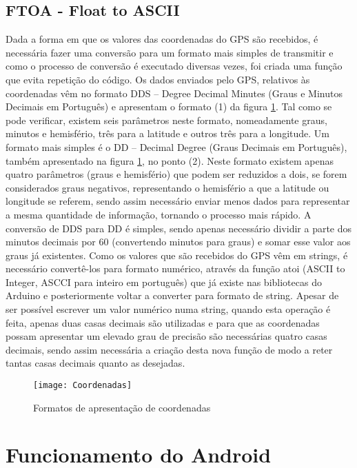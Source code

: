 \subsection{FTOA - Float to ASCII}
\label{sub:FTOA}

Dada a forma em que os valores das coordenadas do GPS são recebidos, é necessária fazer uma conversão para um formato mais simples de transmitir e como o processo de conversão é executado diversas vezes, foi criada uma função que evita repetição do código.
Os dados enviados pelo GPS, relativos às coordenadas vêm no formato DDS – Degree Decimal Minutes (Graus e Minutos Decimais em Português) e apresentam o formato (1) da figura \ref{fig:formatos_de_apresentacao_de_coordenadas}.
Tal como se pode verificar, existem seis parâmetros neste formato, nomeadamente graus, minutos  e hemisfério, três para a latitude e outros três para a longitude. 
Um formato mais simples é o DD – Decimal Degree (Graus Decimais em Português), também apresentado na figura \ref{fig:formatos_de_apresentacao_de_coordenadas}, no ponto (2).
Neste formato existem apenas quatro parâmetros (graus e hemisfério) que podem ser reduzidos a dois, se forem considerados graus negativos, representando o hemisfério a que a latitude ou longitude se referem, sendo assim necessário enviar menos dados para representar a mesma quantidade de informação, tornando o processo mais rápido.
A conversão de DDS para DD é simples, sendo apenas necessário dividir a parte dos minutos decimais por 60 (convertendo minutos para graus) e somar esse valor aos graus já existentes.
Como os valores que são recebidos do GPS vêm em strings, é necessário convertê-los para formato numérico, através da função atoi (ASCII to Integer, ASCCI para inteiro em português) que já existe nas bibliotecas do Arduino e posteriormente voltar a converter para formato de string.
Apesar de ser possível escrever um valor numérico numa string, quando esta operação é feita, apenas duas casas decimais são utilizadas e para que as coordenadas possam apresentar um elevado grau de precisão são necessárias quatro casas decimais, sendo assim necessária a criação desta nova função de modo a reter tantas casas decimais quanto as desejadas.

\begin{figure}[!htbp]
	\centering
	\texttt{[image: Coordenadas]}
	\caption{Formatos de apresentação de coordenadas}
	\label{fig:formatos_de_apresentacao_de_coordenadas}
\end{figure}

\section{Funcionamento do Android}
\label{sec:funcionamento_do_android}


